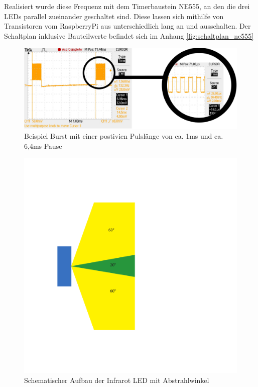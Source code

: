 Realisiert wurde diese Frequenz mit dem Timerbaustein NE555, an den die drei LEDs parallel zueinander geschaltet sind. Diese lassen sich mithilfe von Transistoren vom RaspberryPi aus unterschiedlich lang an und ausschalten. Der Schaltplan inklusive Bauteilwerte befindet sich im Anhang \ref{fig:schaltplan_ne555}

\begin{figure}[!h]
	\includegraphics[width=\textwidth]{images/ir_burst_with_zoom.pdf}
	\caption{Beispiel Burst mit einer postivien Pulslänge von ca. 1ms und ca. 6,4ms Pause}
	\label{fig:ir_burst}
\end{figure}

\begin{figure}[!h]
	\centering
	\includegraphics[width=\textwidth]{images/ir_led_aufbau.pdf}
	\caption{Schematischer Aufbau der Infrarot LED mit Abstrahlwinkel}
	\label{fig:ir_led_aufbau}
\end{figure}

